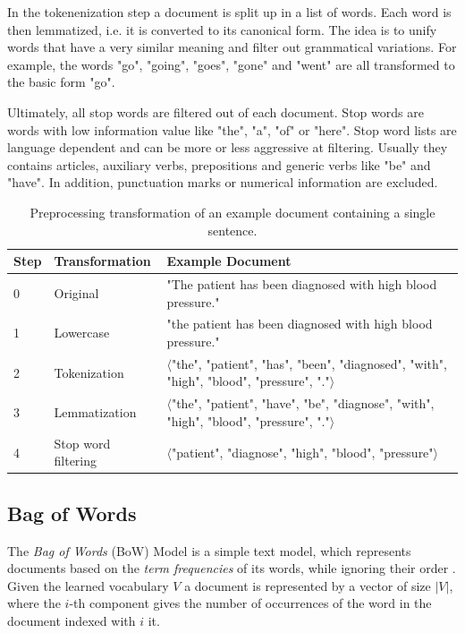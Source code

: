 In the tokenenization step a document is split up in a list of words.
Each word is then lemmatized, i.e. it is converted to its canonical form.
The idea is to unify words that have a very similar meaning and filter out grammatical variations.
For example, the words  "go", "going", "goes", "gone" and "went" are all transformed to the basic form "go".

Ultimately, all stop words are filtered out of each document.
Stop words are words with low information value like "the", "a", "of" or "here".
Stop word lists are language dependent and can be more or less aggressive at filtering.
Usually they contains articles, auxiliary verbs, prepositions and generic verbs like "be" and "have".
In addition, punctuation marks or numerical information are excluded.

\begin{table}[!htbp]
	\begin{tabularx}{\textwidth}{l l p{9.8cm}}
		\toprule
		\textbf{Step} & \textbf{Transformation} & \textbf{Example Document}                                                       \\ \midrule
		0             & Original       & "The patient has been diagnosed with high blood pressure." \\
		1             & Lowercase               & "the patient has been diagnosed with high blood pressure." \\
		2 & Tokenization  & $\langle$"the", "patient", "has", "been", "diagnosed", "with", "high", "blood", "pressure", "."$\rangle$ \\
		3 & Lemmatization & $\langle$"the", "patient", "have", "be", "diagnose", "with", "high", "blood", "pressure", "."$\rangle$  \\
		4             & Stop word filtering     & $\langle$"patient", "diagnose", "high", "blood", "pressure"$\rangle$ \\ \bottomrule
	\end{tabularx}
	\caption{Preprocessing transformation of an example document containing a single sentence.}
	\label{tab:text-preprocessing}
\end{table}


\subsection{Bag of Words}

The \textit{Bag of Words} (BoW) Model is a simple text model, which represents documents based on the \textit{term frequencies} of its words, while ignoring their order \cite{harris1954distributional}.
Given the learned vocabulary $V$ a document is represented by a vector of size $|V|$, where the $i$-th component gives the number of occurrences of the word in the document indexed with $i$ it.


